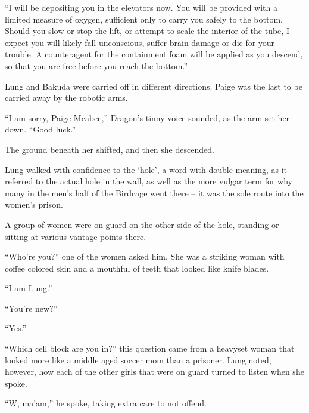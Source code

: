 ``I will be depositing you in the elevators now.  You will be provided with a limited measure of oxygen, sufficient only to carry you safely to the bottom.  Should you slow or stop the lift, or attempt to scale the interior of the tube, I expect you will likely fall unconscious, suffer brain damage or die for your trouble.  A counteragent for the containment foam will be applied as you descend, so that you are free before you reach the bottom.''



Lung and Bakuda were carried off in different directions.  Paige was the last to be carried away by the robotic arms.



``I am sorry, Paige Mcabee,'' Dragon's tinny voice sounded, as the arm set her down.  ``Good luck.''



The ground beneath her shifted, and then she descended.



\sectionbreak



Lung walked with confidence to the `hole', a word with double meaning, as it referred to the actual hole in the wall, as well as the more vulgar term for why many in the men's half of the Birdcage went there – it was the sole route into the women's prison.



A group of women were on guard on the other side of the hole, standing or sitting at various vantage points there.



``Who're you?'' one of the women asked him.  She was a striking woman with coffee colored skin and a mouthful of teeth that looked like knife blades.



``I am Lung.''



``You're new?''



``Yes.''



``Which cell block are you in?'' this question came from a heavyset woman that looked more like a middle aged soccer mom than a prisoner.  Lung noted, however, how each of the other girls that were on guard turned to listen when she spoke.



``W, ma'am,'' he spoke, taking extra care to not offend.



